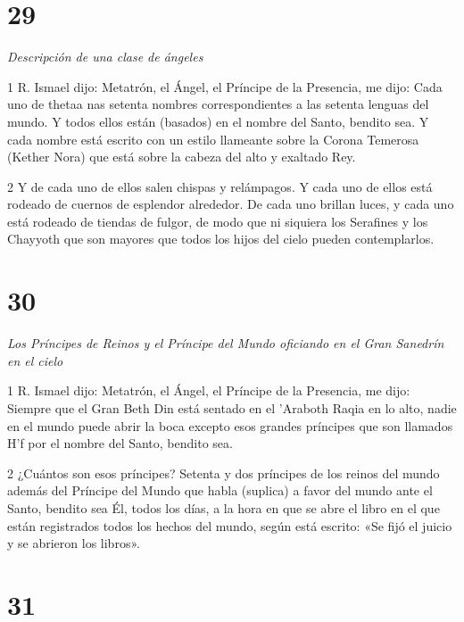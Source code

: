 \chapter{29}

\par \textit{Descripción de una clase de ángeles}

\par 1 R. Ismael dijo: Metatrón, el Ángel, el Príncipe de la Presencia, me dijo: Cada uno de thetaa nas setenta nombres correspondientes a las setenta lenguas del mundo. Y todos ellos están (basados) en el nombre del Santo, bendito sea. Y cada nombre está escrito con un estilo llameante sobre la Corona Temerosa (Kether Nora) que está sobre la cabeza del alto y exaltado Rey.

\par 2 Y de cada uno de ellos salen chispas y relámpagos. Y cada uno de ellos está rodeado de cuernos de esplendor alrededor. De cada uno brillan luces, y cada uno está rodeado de tiendas de fulgor, de modo que ni siquiera los Serafines y los Chayyoth que son mayores que todos los hijos del cielo pueden contemplarlos.

\chapter{30}

\par \textit{Los Príncipes de Reinos y el Príncipe del Mundo oficiando en el Gran Sanedrín en el cielo}

\par 1 R. Ismael dijo: Metatrón, el Ángel, el Príncipe de la Presencia, me dijo: Siempre que el Gran Beth Din está sentado en el 'Araboth Raqia en lo alto, nadie en el mundo puede abrir la boca excepto esos grandes príncipes que son llamados H'f por el nombre del Santo, bendito sea.

\par 2 ¿Cuántos son esos príncipes? Setenta y dos príncipes de los reinos del mundo además del Príncipe del Mundo que habla (suplica) a favor del mundo ante el Santo, bendito sea Él, todos los días, a la hora en que se abre el libro en el que están registrados todos los hechos del mundo, según está escrito: «Se fijó el juicio y se abrieron los libros».

\chapter{31}

